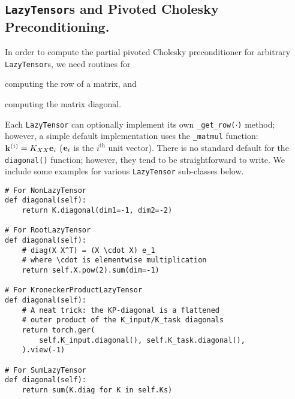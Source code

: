\subsection{{\tt LazyTensor}s and Pivoted Cholesky Preconditioning.}
In order to compute the partial pivoted Cholesky preconditioner for arbitrary {\tt LazyTensor}s, we need routines for
\begin{enumerate*}
  \item computing the row of a matrix, and
  \item computing the matrix diagonal.
\end{enumerate*}
%
Each {\tt LazyTensor} can optionally implement its own {\tt \_get\_row($\cdot$)} method; however, a simple default implementation uses the {\tt \_matmul} function:
$
  \mathbf{k}^{(i)} = K_{XX} \mathbf{e}_i
$
($\mathbf{e}_i$ is the $i^\text{th}$ unit vector).
There is no standard default for the {\tt diagonal()} function; however, they tend to be straightforward to write.
We include some examples for various {\tt LazyTensor} sub-classes below.
%
\begin{verbatim}
# For NonLazyTensor
def diagonal(self):
    return K.diagonal(dim1=-1, dim2=-2)

# For RootLazyTensor
def diagonal(self):
    # diag(X X^T) = (X \cdot X) e_1
    # where \cdot is elementwise multiplication
    return self.X.pow(2).sum(dim=-1)

# For KroneckerProductLazyTensor
def diagonal(self):
    # A neat trick: the KP-diagonal is a flattened
    # outer product of the K_input/K_task diagonals
    return torch.ger(
        self.K_input.diagonal(), self.K_task.diagonal(),
    ).view(-1)

# For SumLazyTensor
def diagonal(self):
    return sum(K.diag for K in self.Ks)
\end{verbatim}
